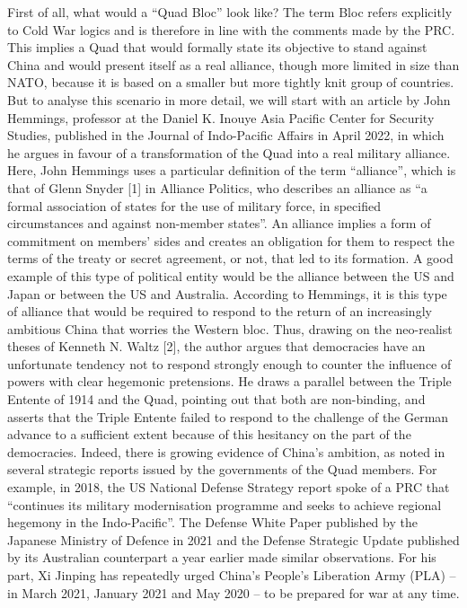 \documentclass[11pt,a4paper]{article}
\begin{document}
First of all, what would a “Quad Bloc” look like? The term Bloc refers explicitly to Cold War logics and is therefore in line with the comments made by the PRC. This implies a Quad that would formally state its objective to stand against China and would present itself as a real alliance, though more limited in size than NATO, because it is based on a smaller but more tightly knit group of countries. But to analyse this scenario in more detail, we will start with an article by John Hemmings, professor at the Daniel K. Inouye Asia Pacific Center for Security Studies, published in the Journal of Indo-Pacific Affairs in April 2022, in which he argues in favour of a transformation of the Quad into a real military alliance. Here, John Hemmings uses a particular definition of the term “alliance”, which is that of Glenn Snyder {[}1{]} in Alliance Politics, who describes an alliance as “a formal association of states for the use of military force, in specified circumstances and against non-member states”. An alliance implies a form of commitment on members’ sides and creates an obligation for them to respect the terms of the treaty or secret agreement, or not, that led to its formation. A good example of this type of political entity would be the alliance between the US and Japan or between the US and Australia. According to Hemmings, it is this type of alliance that would be required to respond to the return of an increasingly ambitious China that worries the Western bloc. Thus, drawing on the neo-realist theses of Kenneth N. Waltz {[}2{]}, the author argues that democracies have an unfortunate tendency not to respond strongly enough to counter the influence of powers with clear hegemonic pretensions. He draws a parallel between the Triple Entente of 1914 and the Quad, pointing out that both are non-binding, and asserts that the Triple Entente failed to respond to the challenge of the German advance to a sufficient extent because of this hesitancy on the part of the democracies. Indeed, there is growing evidence of China’s ambition, as noted in several strategic reports issued by the governments of the Quad members. For example, in 2018, the US National Defense Strategy report spoke of a PRC that “continues its military modernisation programme and seeks to achieve regional hegemony in the Indo-Pacific”. The Defense White Paper published by the Japanese Ministry of Defence in 2021 and the Defense Strategic Update published by its Australian counterpart a year earlier made similar observations. For his part, Xi Jinping has repeatedly urged China’s People’s Liberation Army (PLA) – in March 2021, January 2021 and May 2020 – to be prepared for war at any time.
\end{document}
